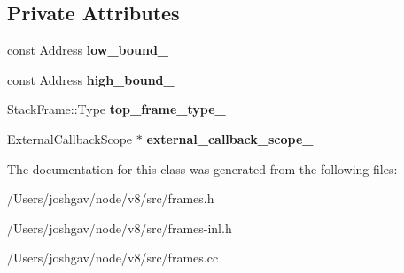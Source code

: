 \subsection*{Private Attributes}
\begin{DoxyCompactItemize}
\item 
const Address {\bfseries low\+\_\+bound\+\_\+}\hypertarget{classv8_1_1internal_1_1_safe_stack_frame_iterator_a666804df792176ec2aa4b88c7247f824}{}\label{classv8_1_1internal_1_1_safe_stack_frame_iterator_a666804df792176ec2aa4b88c7247f824}

\item 
const Address {\bfseries high\+\_\+bound\+\_\+}\hypertarget{classv8_1_1internal_1_1_safe_stack_frame_iterator_ad59b788a4ee20576b66e239c9b06cc34}{}\label{classv8_1_1internal_1_1_safe_stack_frame_iterator_ad59b788a4ee20576b66e239c9b06cc34}

\item 
Stack\+Frame\+::\+Type {\bfseries top\+\_\+frame\+\_\+type\+\_\+}\hypertarget{classv8_1_1internal_1_1_safe_stack_frame_iterator_a1f270225ea477da1b3ac6233aa317f96}{}\label{classv8_1_1internal_1_1_safe_stack_frame_iterator_a1f270225ea477da1b3ac6233aa317f96}

\item 
External\+Callback\+Scope $\ast$ {\bfseries external\+\_\+callback\+\_\+scope\+\_\+}\hypertarget{classv8_1_1internal_1_1_safe_stack_frame_iterator_a2416165ea7dd46bfa332fdf9f1ef68c6}{}\label{classv8_1_1internal_1_1_safe_stack_frame_iterator_a2416165ea7dd46bfa332fdf9f1ef68c6}

\end{DoxyCompactItemize}


The documentation for this class was generated from the following files\+:\begin{DoxyCompactItemize}
\item 
/\+Users/joshgav/node/v8/src/frames.\+h\item 
/\+Users/joshgav/node/v8/src/frames-\/inl.\+h\item 
/\+Users/joshgav/node/v8/src/frames.\+cc\end{DoxyCompactItemize}
